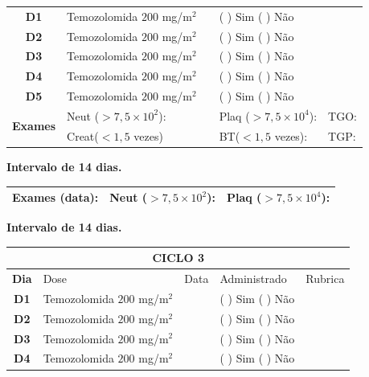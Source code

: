 \documentclass[11pt,a4paper,oldfontcommands]{memoir}
\begin{document}
\begin{center}
\begin{table}[H]
\begin{tabular}{p{1cm}p{5cm}|p{1cm}|p{4.5cm}|p{2cm}}
    \hline
    \multicolumn{1}{c|}{\multirow{1}{*}{\textbf{D1}}}&{Temozolomida \(200\) mg/m\(^2\)}&&{(  ) Sim (  ) Não}&\\
    \multicolumn{1}{c|}{\multirow{1}{*}{\textbf{D2}}}&{Temozolomida \(200\) mg/m\(^2\)}&&{(  ) Sim (  ) Não}&\\
    \multicolumn{1}{c|}{\multirow{1}{*}{\textbf{D3}}}&{Temozolomida \(200\) mg/m\(^2\)}&&{(  ) Sim (  ) Não}&\\
    \multicolumn{1}{c|}{\multirow{1}{*}{\textbf{D4}}}&{Temozolomida \(200\) mg/m\(^2\)}&&{(  ) Sim (  ) Não}&\\
    \multicolumn{1}{c|}{\multirow{1}{*}{\textbf{D5}}}&{Temozolomida \(200\) mg/m\(^2\)}&&{(  ) Sim (  ) Não}&\\
    \hline
    \multicolumn{1}{c|}{\multirow{2}{*}{\textbf{Exames}}}&\multicolumn{2}{l|}{Neut (\(>7,5\times10^2\)):}&{Plaq (\(>7,5\times10^4\)):}&{TGO:}\\
    \cline{2-5}
    \multicolumn{1}{c|}{\multirow{2}{*}{{}}}&\multicolumn{2}{l|}{Creat(\(<1,5\) vezes)}&{BT(\(<1,5\) vezes):}&{TGP:}
    \\
    \hline
\end{tabular}
\end{table}
\textbf{Intervalo de 14 dias.}
\begin{table}[H]
\begin{tabular}{p{5cm}|p{5cm}|p{4.7cm}}
    \hline
    \textbf{Exames (data):}&{Neut (\(>7,5\times10^2\)):}&{Plaq (\(>7,5\times10^4\)):}
    \\
    \hline
\end{tabular}
\end{table}
\textbf{Intervalo de 14 dias.}
\begin{table}[H]
\begin{tabular}{p{1cm}p{5cm}|p{1cm}|p{4.5cm}|p{2cm}}
	\hline
	\multicolumn{5}{c}{\textbf{CICLO 3}}\\
\hline
    \multicolumn{1}{c|}{\multirow{1}{*}{\textbf{Dia}}}&{Dose}&{Data}&{Administrado}&{Rubrica} \\
    \hline
    \multicolumn{1}{c|}{\multirow{1}{*}{\textbf{D1}}}&{Temozolomida \(200\) mg/m\(^2\)}&&{(  ) Sim (  ) Não}&\\
    \multicolumn{1}{c|}{\multirow{1}{*}{\textbf{D2}}}&{Temozolomida \(200\) mg/m\(^2\)}&&{(  ) Sim (  ) Não}&\\
    \multicolumn{1}{c|}{\multirow{1}{*}{\textbf{D3}}}&{Temozolomida \(200\) mg/m\(^2\)}&&{(  ) Sim (  ) Não}&\\
    \multicolumn{1}{c|}{\multirow{1}{*}{\textbf{D4}}}&{Temozolomida \(200\) mg/m\(^2\)}&&{(  ) Sim (  ) Não}&\\

\end{tabular}
\end{table}
\end{center}
\end{document}
